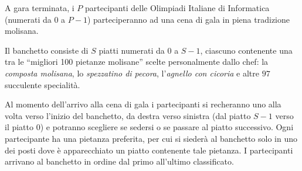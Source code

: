 \usepackage{xcolor}
\usepackage{afterpage}
\usepackage{pifont,mdframed}
\usepackage[bottom]{footmisc}
\usepackage{multicol}


\renewcommand{\inputfile}{\texttt{stdin}}
\renewcommand{\outputfile}{\texttt{stdout}}
\makeatletter
\renewcommand{\this@inputfilename}{\texttt{stdin}}
\renewcommand{\this@outputfilename}{\texttt{stdout}}
\makeatother

\newenvironment{warning}
  {\par\begin{mdframed}[linewidth=2pt,linecolor=gray]%
    \begin{list}{}{\leftmargin=1cm
                   \labelwidth=\leftmargin}\item[\Large\ding{43}]}
  {\end{list}\end{mdframed}\par}
\newenvironment{danger}
{\par\begin{mdframed}[linewidth=2pt,linecolor=red!60!yellow,backgroundcolor=red!20!white]%
		\begin{list}{}{\leftmargin=1cm
				\labelwidth=\leftmargin}\item[\Large\ding{45}]}
		{\end{list}\end{mdframed}\par}


A gara terminata, i $P$ partecipanti delle Olimpiadi Italiane di Informatica
(numerati da $0$ a $P-1$) parteciperanno ad una cena di gala in piena tradizione
molisana.

Il banchetto consiste di $S$ piatti numerati da $0$ a $S-1$, ciascuno contenente
una tra le ``migliori 100 pietanze molisane'' scelte personalmente dallo chef:
la \emph{composta molisana}, lo \emph{spezzatino di pecora}, l'\emph{agnello con
cicoria} e altre $97$ succulente specialità.

Al momento dell'arrivo alla cena di gala i partecipanti si recheranno uno alla
volta verso l'inizio del banchetto, da destra verso sinistra (dal piatto $S-1$
verso il piatto $0$) e potranno scegliere se sedersi o se passare al piatto
successivo. Ogni partecipante ha una pietanza preferita, per cui si siederà al
banchetto solo in uno dei posti dove è apparecchiato un piatto contenente tale
pietanza. I partecipanti arrivano al banchetto in ordine dal primo all'ultimo
classificato.

